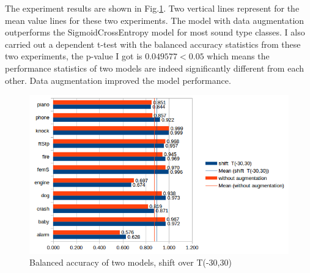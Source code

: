 The experiment results are shown in Fig.\ref{fig:balcompare1}. Two vertical lines represent for the mean value lines for these two experiments. The model with data augmentation outperforms the SigmoidCrossEntropy model for most sound type classes. I also carried out a dependent t-test with the balanced accuracy statistics from these two experiments, the p-value I got is $0.049577<0.05$ which means the performance statistics of two models are indeed significantly different from each other. Data augmentation improved the model performance.
\begin{figure}[h!]
	\caption{Balanced accuracy of two models, shift over T(-30,30)}
	\label{fig:balcompare1}
	\centering
	\includegraphics[scale=0.85]{../image/chapter3/bal_acc_T1.png}
\end{figure}

